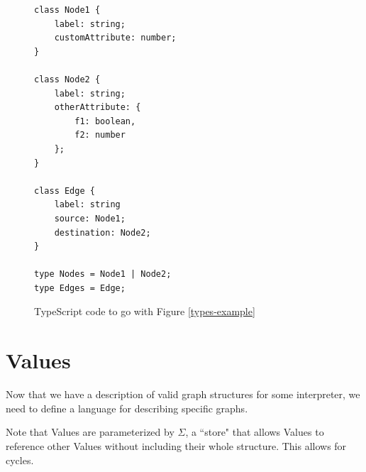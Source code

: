 \documentclass{article}
\begin{document}
\begin{figure}
\begin{mdframed}    
\begin{multicols}{2}
\begin{verbatim}
class Node1 {
    label: string;
    customAttribute: number;
}

class Node2 {
    label: string;
    otherAttribute: {
        f1: boolean,
        f2: number
    };
}

class Edge {
    label: string
    source: Node1;
    destination: Node2;
}

type Nodes = Node1 | Node2;
type Edges = Edge;
\end{verbatim}
\end{multicols}
\end{mdframed}
\caption{TypeScript code to go with Figure \ref{types-example}}
\label{types-example-code}
\end{figure}

\section{Values}

Now that we have a description of valid graph structures for some
interpreter, we need to define a language for describing specific 
graphs. 

Note that Values are parameterized by \(\Sigma\), a ``store" that
allows Values to reference other Values without including their 
whole structure. This allows for cycles. 
\end{document}
